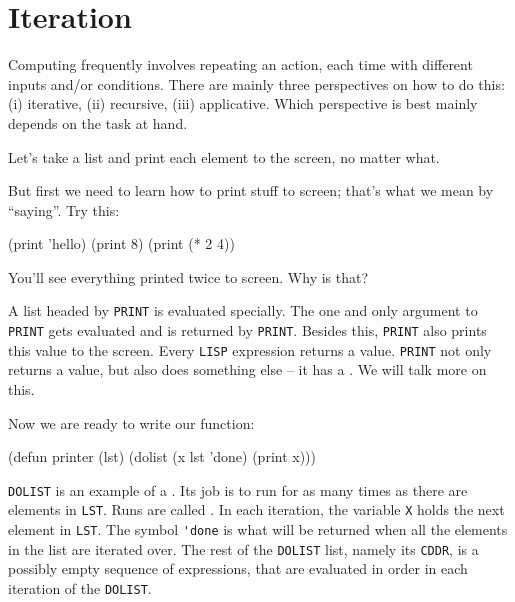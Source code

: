 \documentclass[a4paper,11pt]{article}
\begin{document}
\newpage

\section{Iteration}

\begin{uenum}
\item Computing frequently involves repeating an action, each time with different inputs and/or conditions. There are mainly three perspectives on how to do this: (i) iterative, (ii) recursive, (iii) applicative. Which perspective is best mainly depends on the task at hand.

\item Let's take a list and print each element to the screen, no matter what. 

\item But first we need to learn how to print stuff to screen; that's what we mean by ``saying''. Try this: 

\begin{lispcode}
(print 'hello)
(print 8)
(print (* 2 4))
\end{lispcode}

\begin{uenumi}

\item You'll see everything printed twice to screen. Why is that?

\item A list headed by \Verb+PRINT+ is evaluated specially. The one and only argument to \Verb+PRINT+ gets evaluated and is returned by \Verb+PRINT+. Besides this, \Verb+PRINT+ also prints this value to the screen. Every \Verb+LISP+ expression returns a value. \Verb+PRINT+ not only returns a value, but also does something else -- it has a . We will talk more on this. 
\end{uenumi}

\item Now we are ready to write our function:

\begin{lispcode}
(defun printer (lst)
  (dolist (x lst 'done)
	(print x)))
\end{lispcode}

\item \Verb+DOLIST+ is an example of a . Its job is to run for as many times as there are elements in \Verb+LST+. Runs are called . In each iteration, the variable \Verb+X+ holds the next element in \Verb+LST+. The symbol \Verb+'done+ is what will be returned when all the elements in the list are iterated over. The rest of the \Verb+DOLIST+ list, namely its \Verb+CDDR+, is a possibly empty sequence of expressions, that are evaluated in order in each iteration of the \Verb+DOLIST+.


\end{uenum}
\end{document}
